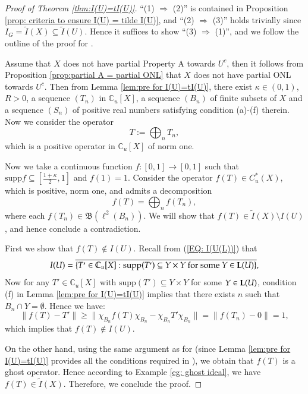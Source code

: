 \documentclass[12pt, a4paper]{amsart}
\numberwithin{equation}{section}
\theoremstyle{definition}
\theoremstyle{remark}
\def\CC{\mathbb{C}}
\def\L{\mathcal{L}}
\def\B{\mathfrak{B}}
\def\supp{\mathrm{supp}}
\def\L{{\bf L}}
\begin{document}
\begin{proof}[Proof of Theorem \ref{thm:I(U)=tI(U)}]
``(1) $\Rightarrow$ (2)'' is contained in Proposition \ref{prop: criteria to ensure I(U) = tilde I(U)}, and ``(2) $\Rightarrow$ (3)'' holds trivially since $I_G = \tilde{I}(X) \subseteq \tilde{I}(U)$. Hence it suffices to show ``(3) $\Rightarrow$ (1)'', and we follow the outline of the proof for \cite[Theorem 1.3]{RW14}. 

Assume that $X$ does not have partial Property A towards $U^c$, then it follows from Proposition \ref{prop:partial A = partial ONL} that $X$ does not have partial ONL towards $U^c$. Then from Lemma \ref{lem:pre for I(U)=tI(U)}, there exist $\kappa \in (0,1)$, $R>0$, a sequence $(T_n)$ in $\CC_u[X]$, a sequence $(B_n)$ of finite subsets of $X$ and a sequence $(S_n)$ of positive real numbers satisfying condition (a)-(f) therein. Now we consider the operator 
\[
T :=\bigoplus_n T_n,
\]
which is a positive operator in $\CC_u[X]$ of norm one. 

Now we take a continuous function $f: [0,1] \to [0,1]$ such that $\supp f \subseteq [\frac{1+\kappa}{2},1]$ and $f(1)=1$. Consider the operator $f(T) \in C^*_u(X)$, which is positive, norm one, and admits a decomposition
\[
f(T) = \bigoplus_n f(T_n),
\]
where each $f(T_n) \in \B(\ell^2(B_n))$. We will show that $f(T) \in \tilde{I}(X)\setminus I(U)$, and hence conclude a contradiction. 

First we show that $f(T) \notin I(U)$. Recall from (\ref{EQ: I(U(L))}) that 
\[
I(U)=\overline{\{T' \in \CC_u[X]: \supp(T') \subseteq Y \times Y \mbox{~for~some~}Y \in \L(U)\}},
\]
Now for any $T' \in \CC_u[X]$ with $\supp(T') \subseteq Y \times Y$ for some $Y \in \L(U)$, condition (f) in Lemma \ref{lem:pre for I(U)=tI(U)} implies that there exists $n$ such that $B_n \cap Y = \emptyset$. Hence we have:
\[
\|f(T) - T'\| \geq \|\chi_{B_n} f(T) \chi_{B_n} - \chi_{B_n} T' \chi_{B_n}\|  = \|f(T_n) - 0\| =1,
\]
which implies that $f(T) \notin I(U)$.

On the other hand, using the same argument as for \cite[Theorem 1.3]{RW14} (since Lemma \ref{lem:pre for I(U)=tI(U)} provides all the conditions required in \cite[Lemma 4.2]{RW14}), we obtain that $f(T)$ is a ghost operator. Hence according to Example \ref{eg: ghost ideal}, we have $f(T) \in \tilde{I}(X)$. Therefore, we conclude the proof.
\end{proof}
\end{document}
